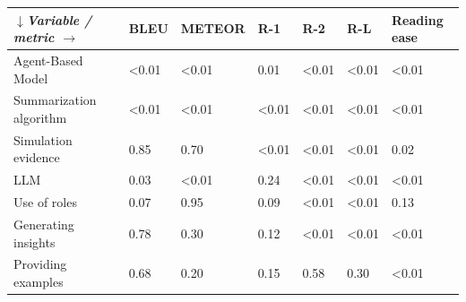 \begin{tabular}{|l|l|l|l|l|l|l|}
\hline
\textit{$\downarrow$Variable / metric $\rightarrow$} & BLEU & METEOR & R-1 & R-2 & R-L & Reading ease \\
 \hline
 Agent-Based Model & \textless{}0.01 & \textless{}0.01 & 0.01 & \textless{}0.01 & \textless{}0.01 & \textless{}0.01 \\
 \hline
 Summarization algorithm & \textless{}0.01 & \textless{}0.01 & \textless{}0.01 & \textless{}0.01 & \textless{}0.01 & \textless{}0.01 \\
 \hline
 Simulation evidence & 0.85 & 0.70 & \textless{}0.01 & \textless{}0.01 & \textless{}0.01 & 0.02 \\
 \hline
 LLM & 0.03 & \textless{}0.01 & 0.24 & \textless{}0.01 & \textless{}0.01 & \textless{}0.01 \\
 \hline
 Use of roles & 0.07 & 0.95 & 0.09 & \textless{}0.01 & \textless{}0.01 & 0.13 \\
 \hline
 Generating insights & 0.78 & 0.30 & 0.12 & \textless{}0.01 & \textless{}0.01 & \textless{}0.01 \\
 \hline
 Providing examples & 0.68 & 0.20 & 0.15 & 0.58 & 0.30 & \textless{}0.01 \\
\hline
\end{tabular}
